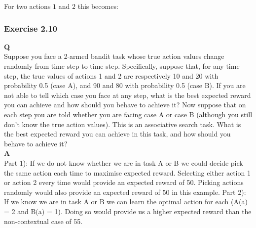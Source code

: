 For two actions \(1\) and \(2\) this becomes:

\subsubsection{Exercise 2.10}
\textbf{Q}\\
Suppose you face a 2-armed bandit task whose true action values change randomly from time step to time step. Specifically, suppose that, for any time step, the true values of actions 1 and 2 are respectively 10 and 20 with probability 0.5 (case A), and 90 and 80 with probability 0.5 (case B). If you are not able to tell which case you face at any step, what is the best expected reward you can achieve and how should you behave to achieve it? Now suppose that on each step you are told whether you are facing case A or case B (although you still don’t know the true action values). This is an associative search task. What is the best expected reward you can achieve in this task, and how should you behave to achieve it?\\

\textbf{A}\\
Part 1): If we do not know whether we are in task A or B we could decide pick the same action each time to maximise expected reward. Selecting either action 1 or action 2 every time would provide an expected reward of 50. Picking actions randomly would also provide an expected reward of 50 in this example.
Part 2): If we know we are in task A or B we can learn the optimal action for each (A(a) = 2 and B(a) = 1). Doing so would provide us a higher expected reward than the non-contextual case of 55.
